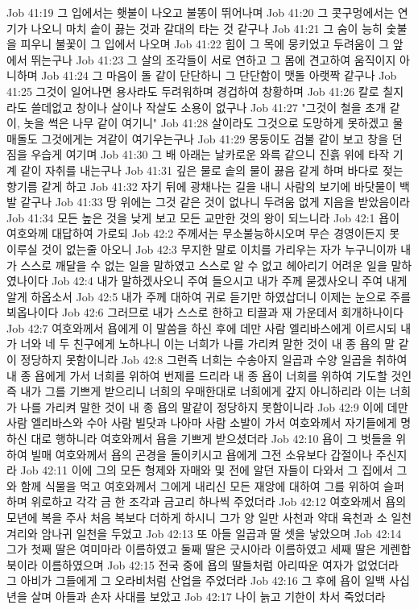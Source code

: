 Job 41:19  그 입에서는 횃불이 나오고 불똥이 뛰어나며
Job 41:20  그 콧구멍에서는 연기가 나오니 마치 솥이 끓는 것과 갈대의 타는 것 같구나
Job 41:21  그 숨이 능히 숯불을 피우니 불꽃이 그 입에서 나오며
Job 41:22  힘이 그 목에 뭉키었고 두려움이 그 앞에서 뛰는구나
Job 41:23  그 살의 조각들이 서로 연하고 그 몸에 견고하여 움직이지 아니하며
Job 41:24  그 마음이 돌 같이 단단하니 그 단단함이 맷돌 아랫짝 같구나
Job 41:25  그것이 일어나면 용사라도 두려워하며 경겁하여 창황하며
Job 41:26  칼로 칠지라도 쓸데없고 창이나 살이나 작살도 소용이 없구나
Job 41:27  "그것이 철을 초개 같이, 놋을 썩은 나무 같이 여기니"
Job 41:28  살이라도 그것으로 도망하게 못하겠고 물매돌도 그것에게는 겨같이 여기우는구나
Job 41:29  몽둥이도 검불 같이 보고 창을 던짐을 우습게 여기며
Job 41:30  그 배 아래는 날카로운 와륵 같으니 진흙 위에 타작 기계 같이 자취를 내는구나
Job 41:31  깊은 물로 솥의 물이 끓음 같게 하며 바다로 젖는 향기름 같게 하고
Job 41:32  자기 뒤에 광채나는 길을 내니 사람의 보기에 바닷물이 백발 같구나
Job 41:33  땅 위에는 그것 같은 것이 없나니 두려움 없게 지음을 받았음이라
Job 41:34  모든 높은 것을 낮게 보고 모든 교만한 것의 왕이 되느니라
Job 42:1  욥이 여호와께 대답하여 가로되
Job 42:2  주께서는 무소불능하시오며 무슨 경영이든지 못 이루실 것이 없는줄 아오니
Job 42:3  무지한 말로 이치를 가리우는 자가 누구니이까 내가 스스로 깨달을 수 없는 일을 말하였고 스스로 알 수 없고 헤아리기 어려운 일을 말하였나이다
Job 42:4  내가 말하겠사오니 주여 들으시고 내가 주께 묻겠사오니 주여 내게 알게 하옵소서
Job 42:5  내가 주께 대하여 귀로 듣기만 하였삽더니 이제는 눈으로 주를 뵈옵나이다
Job 42:6  그러므로 내가 스스로 한하고 티끌과 재 가운데서 회개하나이다
Job 42:7  여호와께서 욥에게 이 말씀을 하신 후에 데만 사람 엘리바스에게 이르시되 내가 너와 네 두 친구에게 노하나니 이는 너희가 나를 가리켜 말한 것이 내 종 욥의 말 같이 정당하지 못함이니라
Job 42:8  그런즉 너희는 수송아지 일곱과 수양 일곱을 취하여 내 종 욥에게 가서 너희를 위하여 번제를 드리라 내 종 욥이 너희를 위하여 기도할 것인즉 내가 그를 기쁘게 받으리니 너희의 우매한대로 너희에게 갚지 아니하리라 이는 너희가 나를 가리켜 말한 것이 내 종 욥의 말같이 정당하지 못함이니라
Job 42:9  이에 데만 사람 엘리바스와 수아 사람 빌닷과 나아마 사람 소발이 가서 여호와께서 자기들에게 명하신 대로 행하니라 여호와께서 욥을 기쁘게 받으셨더라
Job 42:10  욥이 그 벗들을 위하여 빌매 여호와께서 욥의 곤경을 돌이키시고 욥에게 그전 소유보다 갑절이나 주신지라
Job 42:11  이에 그의 모든 형제와 자매와 및 전에 알던 자들이 다와서 그 집에서 그와 함께 식물을 먹고 여호와께서 그에게 내리신 모든 재앙에 대하여 그를 위하여 슬퍼하며 위로하고 각각 금 한 조각과 금고리 하나씩 주었더라
Job 42:12  여호와께서 욥의 모년에 복을 주사 처음 복보다 더하게 하시니 그가 양 일만 사천과 약대 육천과 소 일천 겨리와 암나귀 일천을 두었고
Job 42:13  또 아들 일곱과 딸 셋을 낳았으며
Job 42:14  그가 첫째 딸은 여미마라 이름하였고 둘째 딸은 긋시아라 이름하였고 세째 딸은 게렌합북이라 이름하였으며
Job 42:15  전국 중에 욥의 딸들처럼 아리따운 여자가 없었더라 그 아비가 그들에게 그 오라비처럼 산업을 주었더라
Job 42:16  그 후에 욥이 일백 사십년을 살며 아들과 손자 사대를 보았고
Job 42:17  나이 늙고 기한이 차서 죽었더라



